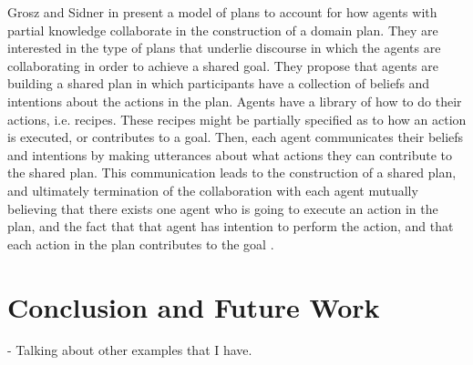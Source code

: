 Grosz and Sidner in \cite{grosz:plans-discourse} present a model of plans to
account for how agents with partial knowledge collaborate in the construction of
a domain plan. They are interested in the type of plans that underlie discourse
in which the agents are collaborating in order to achieve a shared goal. They
propose that agents are building a shared plan in which participants have a
collection of beliefs and intentions about the actions in the plan. Agents have
a library of how to do their actions, i.e. recipes. These recipes might be
partially specified as to how an action is executed, or contributes to a goal.
Then, each agent communicates their beliefs and intentions by making utterances
about what actions they can contribute to the shared plan. This communication
leads to the construction of a shared plan, and ultimately termination of the
collaboration with each agent mutually believing that there exists one agent who
is going to execute an action in the plan, and the fact that that agent has
intention to perform the action, and that each action in the plan contributes to
the goal \cite{grosz:plans-discourse,lochbaum:plan-models}.

\section{Conclusion and Future Work}

- Talking about other examples that I have.




%
%



